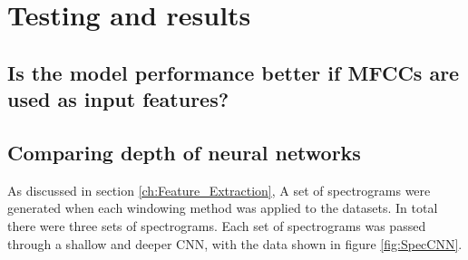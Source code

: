 \documentclass[class=report,11pt,crop=false]{standalone}
\begin{document}
\ifstandalone
\tableofcontents
\fi
\section{Testing and results \label{ch:T_R}}




\subsection{Is the model performance better if MFCCs are used as input features?}


\subsection{Comparing depth of neural networks}

As discussed in section \ref{ch:Feature_Extraction}, A set of spectrograms were generated when each windowing method was applied to the datasets. In total there were three sets of spectrograms. Each set of spectrograms was passed through a shallow and deeper CNN, with the data shown in figure \ref{fig:SpecCNN}.
\end{document}
